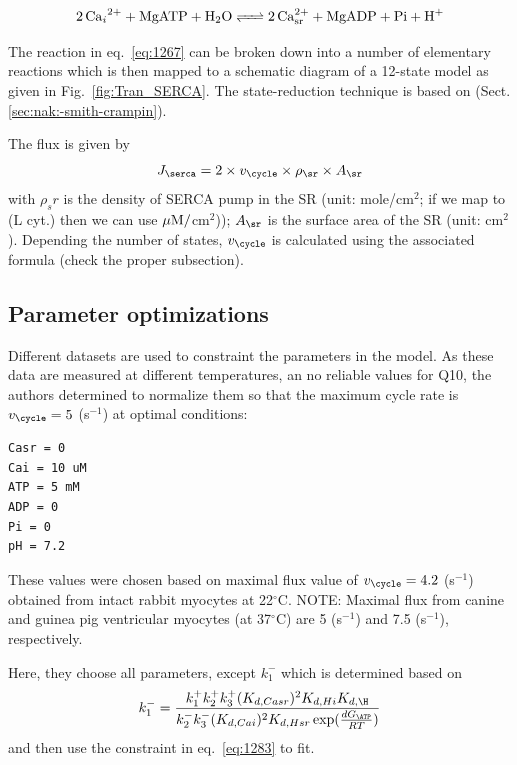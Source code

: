 \begin{equation}
  \label{eq:1267}
  \ce{2Ca_i^{2+} + MgATP + H2O <=> 2Ca^{2+}_{sr} + MgADP + Pi + H+}
\end{equation}

The reaction in eq.~\eqref{eq:1267} can be broken down into a number
of elementary reactions which is then mapped to a schematic diagram of
a 12-state model as given in Fig.~\ref{fig:Tran_SERCA}. The state-reduction
technique is based on \citep{smith2004} (Sect.\ref{sec:nak:-smith-crampin}). 

The flux is given by
\begin{equation}
J_\serca = 2 \times v_\cycle \times \rho_\sr \times A_\sr
\end{equation}
with $\rho_sr$ is the density of SERCA pump in the SR (unit: mole/cm$^2$; if
we map to (L cyt.) then we can use ${\mu\text{M}}/$cm$^2$)); $A_\sr$ is the surface area
of the SR (unit: cm$^2$). Depending the number of states, $v_\cycle$ is
calculated using the associated formula (check the proper subsection).

\subsection{Parameter optimizations}
 \label{sec:param-estim}

Different datasets are used to constraint the parameters in the model. As these
data are measured at different temperatures, an no reliable values for Q10, the
authors determined to normalize them so that the maximum cycle rate is
$v_\cycle = 5$ (s$^{-1}$) at optimal conditions: 
\begin{verbatim}
Casr = 0
Cai = 10 uM
ATP = 5 mM
ADP = 0
Pi = 0
pH = 7.2
\end{verbatim}
These values were chosen based on maximal flux value of $v_\cycle=4.2$
(s$^{-1}$) obtained from intact rabbit myocytes at 22$^\circ$C. NOTE: Maximal
flux from canine and guinea pig ventricular myocytes (at 37$^\circ$C) are 5
(s$^{-1}$) and 7.5 (s$^{-1}$), respectively. 


Here, they choose all parameters, except $k^-_1$ which is determined based on
\begin{equation}
  \label{eq:1346}
  k^-_1 = \frac{k^+_1k^+_2k^+_3(K_{d,Casr})^2K_{d,Hi}K_{d,\H}}{k^-_2k^-_3(K_{d,Cai})^2K_{d,Hsr}\exp(\frac{dG_\ATP}{RT})}
\end{equation}
and then use the constraint in eq.~\eqref{eq:1283} to fit.

